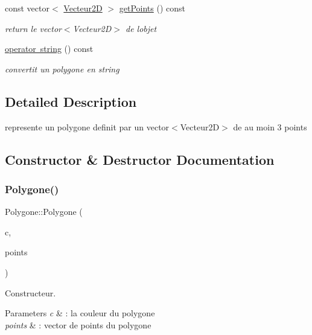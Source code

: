 \begin{DoxyCompactItemize}
const vector$<$ \mbox{\hyperlink{class_vecteur2_d}{Vecteur2D}} $>$ \mbox{\hyperlink{class_polygone_a3ded5fc50f6db8d734b4272c604d6d8c}{get\+Points}} () const
\begin{DoxyCompactList}\small\item\em return le vector$<$\+Vecteur2\+D$>$ de l\textquotesingle{}objet \end{DoxyCompactList}\item 
\mbox{\label{class_polygone_abd801a84b5306df8021f1571d82deafd}} 
\mbox{\hyperlink{class_polygone_abd801a84b5306df8021f1571d82deafd}{operator string}} () const
\begin{DoxyCompactList}\small\item\em convertit un polygone en string \end{DoxyCompactList}\end{DoxyCompactItemize}


\subsection{Detailed Description}
represente un polygone definit par un vector$<$\+Vecteur2\+D$>$ de au moin 3 points 

\subsection{Constructor \& Destructor Documentation}
\mbox{\label{class_polygone_a42d0618a808a036f953c81987cd38d97}} 
\subsubsection{\texorpdfstring{Polygone()}{Polygone()}}
{\footnotesize\ttfamily Polygone\+::\+Polygone (\begin{DoxyParamCaption}\item[{\mbox{\hyperlink{class_couleur}{Couleur}}}]{c,  }\item[{const vector$<$ \mbox{\hyperlink{class_vecteur2_d}{Vecteur2D}} $>$}]{points }\end{DoxyParamCaption})}



Constructeur. 


\begin{DoxyParams}{Parameters}
{\em c} & \+: la couleur du polygone \\
\hline
{\em points} & \+: vector de points du polygone \\
\hline
\end{DoxyParams}


